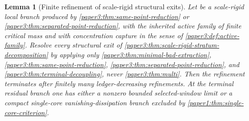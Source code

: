 \documentclass[11pt]{amsart}
\def\({}%
\def\){}%
\theoremstyle{plain}
\newtheorem{lemma}[lemma]{Lemma}
\theoremstyle{definition}
\theoremstyle{remark}
\begin{document}
\begin{lemma}[Finite refinement of scale-rigid structural exits]
\label{paper3:lem:scale-rigid-refinement-terminates}
Let \(\omega\) be a scale-rigid local branch produced by
\cref{paper3:thm:same-point-reduction} or
\cref{paper3:thm:separated-point-reduction}, with the inherited active family
of finite critical mass and with concentration capture in the sense of
\cref{paper3:def:active-family}.  Resolve every structural exit of
\cref{paper3:thm:scale-rigid-stratum-decomposition} by applying only
\cref{paper3:thm:minimal-bad-extraction},
\cref{paper3:thm:same-point-reduction},
\cref{paper3:thm:separated-point-reduction}, and
\cref{paper3:thm:terminal-decoupling}, never
\cref{paper3:thm:multi}.  Then the refinement terminates after finitely many
ledger-decreasing refinements.  At the terminal residual branch one has either a nonzero
bounded selected-window limit or a compact single-core
vanishing-dissipation branch excluded by
\cref{paper1:thm:single-core-criterion}.
\end{lemma}
\end{document}
